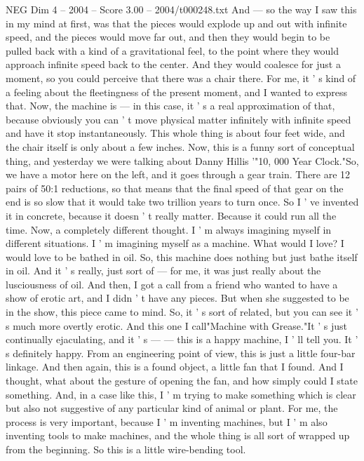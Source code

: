 \begin{textsample}{NEG Dim 4 – 2004 – Score 3.00 – 2004/t000248.txt}
And — so the way I saw this in my mind at first, was that the pieces would explode up and out with infinite speed, and the pieces would move far out, and then they would begin to be pulled back with a kind of a gravitational feel, to the point where they would approach infinite speed back to the center.
And they would coalesce for just a moment, so you could perceive that there was a chair there.
For me, it ' s kind of a feeling about the fleetingness of the present moment, and I wanted to express that.
Now, the machine is — in this case, it ' s a real approximation of that, because obviously you can ' t move physical matter infinitely with infinite speed and have it stop instantaneously.
This whole thing is about four feet wide, and the chair itself is only about a few inches.
Now, this is a funny sort of conceptual thing, and yesterday we were talking about Danny Hillis '"10, 000 Year Clock."So, we have a motor here on the left, and it goes through a gear train.
There are 12 pairs of 50:1 reductions, so that means that the final speed of that gear on the end is so slow that it would take two trillion years to turn once.
So I ' ve invented it in concrete, because it doesn ' t really matter.
Because it could run all the time.
Now, a completely different thought.
I ' m always imagining myself in different situations.
I ' m imagining myself as a machine.
What would I love?
I would love to be bathed in oil.
So, this machine does nothing but just bathe itself in oil.
And it ' s really, just sort of — for me, it was just really about the lusciousness of oil.
And then, I got a call from a friend who wanted to have a show of erotic art, and I didn ' t have any pieces.
But when she suggested to be in the show, this piece came to mind.
So, it ' s sort of related, but you can see it ' s much more overtly erotic.
And this one I call"Machine with Grease."It ' s just continually ejaculating, and it ' s — — this is a happy machine, I ' ll tell you.
It ' s definitely happy.
From an engineering point of view, this is just a little four-bar linkage.
And then again, this is a found object, a little fan that I found.
And I thought, what about the gesture of opening the fan, and how simply could I state something.
And, in a case like this, I ' m trying to make something which is clear but also not suggestive of any particular kind of animal or plant.
For me, the process is very important, because I ' m inventing machines, but I ' m also inventing tools to make machines, and the whole thing is all sort of wrapped up from the beginning.
So this is a little wire-bending tool.

\end{textsample}
